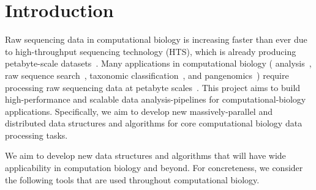 


\section{Introduction}
\label{intro}





Raw sequencing data in computational biology is increasing faster than ever
due to high-throughput sequencing technology (HTS), which is already producing
petabyte-scale datasets~\cite{kodama2012sequence}. Many applications in computational biology (\kmer
analysis~\cite{MarccaisKi11}, raw sequence search~\cite{SolomonKi16}, taxonomic classification~\cite{wood2014kraken}, and pangenomics~\cite{computational2018computational})
require processing raw sequencing data at petabyte scales~\cite{kodama2012sequence}. This project aims to
build high-performance and scalable data analysis-pipelines for computational-biology applications.
Specifically, we aim to develop new massively-parallel and distributed data structures and algorithms for core computational biology data processing tasks.


We aim to develop new data structures and algorithms that will have wide applicability in computation biology and beyond. For concreteness, we consider the following tools that are used throughout computational biology.

